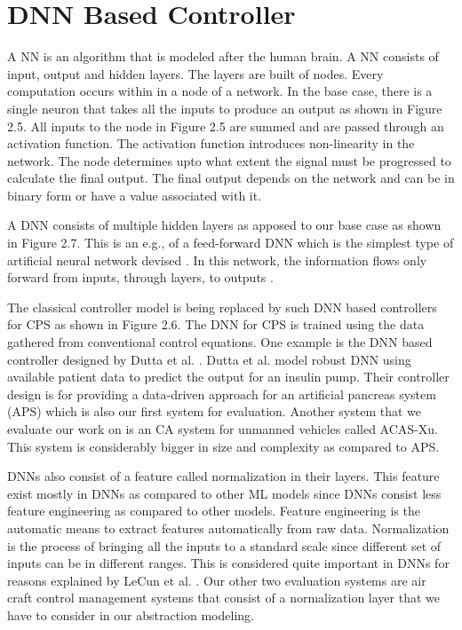 \section{DNN Based Controller}


A \ac{NN} is an algorithm that is modeled after the human brain.
A \ac{NN} consists of input, output and hidden layers. 
The layers are built of nodes. Every computation occurs within in a node of a network.
In the base case, there is a single neuron that takes all the inputs to produce an output as shown in Figure 2.5. 
All inputs to the node in Figure 2.5 are summed and are passed through an activation function. 
The activation function introduces non-linearity in the network. 
The node determines upto what extent the signal must be progressed to calculate the final output. 
The final output depends on the network and can be in binary form or have a value associated with it. 


A \ac{DNN} consists of multiple hidden layers as apposed to our base case  as shown in Figure 2.7.
This is an e.g., of a feed-forward \ac{DNN} which is the simplest type of artificial neural network devised \cite{feedforward}.
In this network, the information flows only forward from inputs, through layers, to outputs \cite{Zell}. 

The classical controller model is being replaced by such DNN based controllers for CPS as shown in  Figure 2.6.
The \ac{DNN} for \ac*{CPS} is trained using the data gathered from conventional control equations. 
One example is the DNN based controller designed by Dutta et al. \cite{Dutta_Others__2018__Robust}. 
Dutta et al. model robust DNN using available patient data to predict the output for an insulin pump.
Their controller design is for providing a data-driven approach for an artificial pancreas system (APS) which is also our first system for evaluation. 
Another system that we evaluate our work on is an \ac{CA} system for unmanned vehicles \cite{7778055} called ACAS-Xu. This system is considerably bigger in size and complexity as compared to \ac{APS}. 

\ac{DNN}s also consist of a feature called normalization in their layers. 
This feature exist mostly in \ac{DNN}s as compared to other \ac{ML} models since \ac{DNN}s consist less feature engineering as compared to other models. 
Feature engineering is the automatic means to extract features automatically from raw data. 
Normalization is the process of bringing all the inputs to a standard scale since different set of inputs can be in different ranges. 
This is considered quite important in \ac{DNN}s for reasons explained by  LeCun et al.  \cite{10.5555/645754.668382}.
Our other two evaluation systems are air craft  control management systems \cite{10.1007/978-3-319-63387-9_5} that consist of a normalization layer that we have to consider in our abstraction modeling. 



